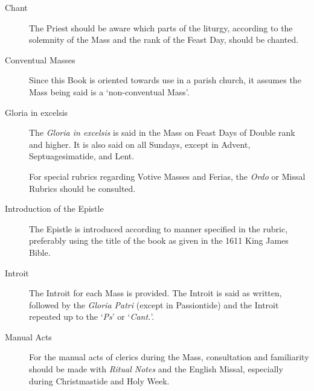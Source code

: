 \begin{description}
    \item[Chant] The Priest should be aware which parts of the liturgy, according to the solemnity of the Mass and the rank of the Feast Day, should be chanted.
    \item[Conventual Masses] %
    Since this Book is oriented towards use in a parish church, it assumes the Mass being said is a `non-conventual Mass'.
    \item[Gloria in excelsis] The \emph{Gloria in excelsis} is said in the Mass on Feast Days of Double rank and higher. It is also said on all Sundays, except in Advent, Septuagesimatide, and Lent.\par
    For special rubrics regarding Votive Masses and Ferias, the \emph{Ordo} or Missal Rubrics should be consulted.
    \item[Introduction of the Epistle] The Epistle is introduced according to manner specified in the rubric, preferably using the title of the book as given in the 1611 King James Bible.
    \item[Introit] The Introit for each Mass is provided. The Introit is said as written, followed by the \emph{Gloria Patri} (except in Passiontide) and the Introit repeated up to the `\emph{Ps}' or `\emph{Cant.}'.
    \item[Manual Acts] For the manual acts of clerics during the Mass, consultation and familiarity should be made with \emph{Ritual Notes} and the English Missal, especially during Christmastide and Holy Week.

\end{description}

